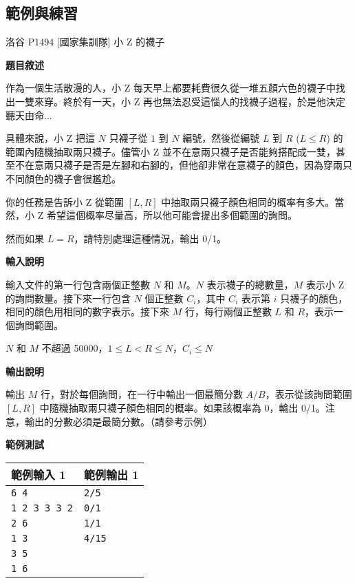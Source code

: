     \subsection{範例與練習}

    \problem 洛谷 P1494 [國家集訓隊] 小 Z 的襪子

    \textbf{題目敘述}

    作為一個生活散漫的人，小 Z 每天早上都要耗費很久從一堆五顏六色的襪子中找出一雙來穿。終於有一天，小 Z 再也無法忍受這惱人的找襪子過程，於是他決定聽天由命...

    具體來說，小 Z 把這 $N$ 只襪子從 $1$ 到 $N$ 編號，然後從編號 $L$ 到 $R$ ($L \leq R$) 的範圍內隨機抽取兩只襪子。儘管小 Z 並不在意兩只襪子是否能夠搭配成一雙，甚至不在意兩只襪子是否是左腳和右腳的，但他卻非常在意襪子的顏色，因為穿兩只不同顏色的襪子會很尷尬。

    你的任務是告訴小 Z 從範圍 $[L,R]$ 中抽取兩只襪子顏色相同的概率有多大。當然，小 Z 希望這個概率尽量高，所以他可能會提出多個範圍的詢問。

    然而如果 $L=R$，請特別處理這種情況，輸出 0/1。

    \textbf{輸入說明}

    輸入文件的第一行包含兩個正整數 $N$ 和 $M$。$N$ 表示襪子的總數量，$M$ 表示小 Z 的詢問數量。接下來一行包含 $N$ 個正整數 $C_i$，其中 $C_i$ 表示第 $i$ 只襪子的顏色，相同的顏色用相同的數字表示。接下來 $M$ 行，每行兩個正整數 $L$ 和 $R$，表示一個詢問範圍。

    $N$ 和 $M$ 不超過 50000，$1 \leq L < R \leq N$，$C_i \leq N$

    \textbf{輸出說明}

    輸出 $M$ 行，對於每個詢問，在一行中輸出一個最簡分數 $A/B$，表示從該詢問範圍 $[L,R]$ 中隨機抽取兩只襪子顏色相同的概率。如果該概率為 $0$，輸出 0/1。注意，輸出的分數必須是最簡分數。（請參考示例）

    \textbf{範例測試}

    \begin{tabular}{|m{7cm}|m{7cm}|}
        \hline
        範例輸入 1 & 範例輸出 1 \\
        \hline
        \verb|6 4| & \verb|2/5| \\
        \verb|1 2 3 3 3 2| & \verb|0/1| \\
        \verb|2 6| & \verb|1/1| \\
        \verb|1 3| & \verb|4/15| \\
        \verb|3 5| & \\
        \verb|1 6| & \\
        \hline
    \end{tabular}

